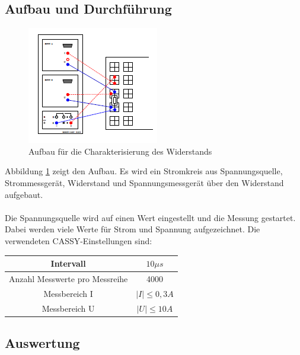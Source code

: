 \documentclass[12pt,a4paper]{article}
\begin{document}
\subsection{Aufbau und Durchführung}
\begin{figure}
\begin{center}
\includegraphics[scale=1.2]{Bilder/Charakterisierung_Widerstand_Aufbau.PNG}
\end{center}
\caption[Widerstand Schaltung]{Aufbau für die Charakterisierung des Widerstands}
\label{fig:Widerstand_Aufbau}
\end{figure}
Abbildung \ref{fig:Widerstand_Aufbau} zeigt den Aufbau. Es wird ein Stromkreis aus Spannungsquelle, Strommessgerät, Widerstand und Spannungsmessgerät über den Widerstand aufgebaut.\\
\\ Die Spannungsquelle wird auf einen Wert eingestellt und die Messung gestartet. Dabei werden viele Werte für Strom und Spannung aufgezeichnet. Die verwendeten CASSY-Einstellungen sind:\\
\begin{center}
\begin{tabular}{|c|c|}

\hline 
Intervall & $10 \mu s$ \\ 
\hline 
Anzahl Messwerte pro Messreihe & 4000 \\ 
\hline 
Messbereich I & $|I| \leq 0,3A$ \\ 
\hline 
Messbereich U & $|U| \leq 10A$ \\ 
\hline 

\end{tabular} 
\end{center}
\subsection{Auswertung}
\end{document}
